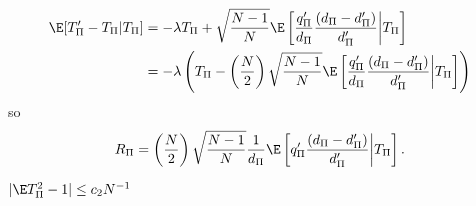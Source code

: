 \begin{align*}
  \E[T_{\Pi}'-T_{\Pi}|T_{\Pi}] 
  &= - \lambda T_{\Pi} + \sqrt{\frac{N-1}{N}}
  \E\left [\frac{q_{\Pi}'}{d_{\Pi}} \frac{(d_{\Pi}-d_{\Pi}')}{d_{\Pi}'}\middle |T_{\Pi} \right ] \\
  &= - \lambda \left ( T_{\Pi} - \left ( \frac{N}{2} \right ) 
    \sqrt{\frac{N-1}{N}}
    \E\left [\frac{q_{\Pi}'}{d_{\Pi}} \frac{(d_{\Pi}-d_{\Pi}')}{d_{\Pi}'}\middle |T_{\Pi} \right ] \right ) 
\end{align*}
so 
\begin{equation}
  \label{def:Rdef}
  R_{\Pi} = \left (\frac{N}{2}\right )\sqrt{\frac{N-1}{N}}\frac{1}{d_{\Pi}}\E
  \left [q_{\Pi}'\frac{(d_{\Pi}-d_{\Pi}')}{d_{\Pi}'} \middle | T_{\Pi} \right ].
\end{equation}

\begin{proposition}
  \label{P:P1}
  $|\E T_{\Pi}^2 -1| \leq c_2 N^{-1}$
\end{proposition}

